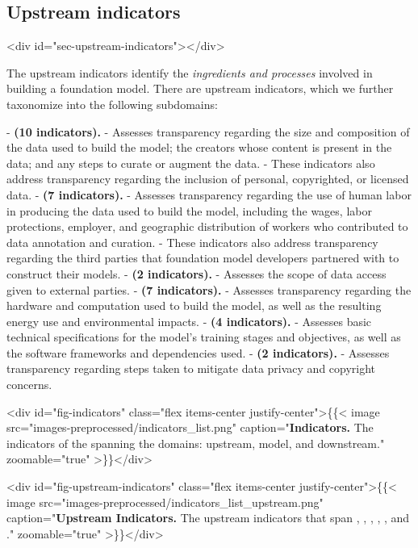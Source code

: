 \documentclass[screen, authorversion, acmsmall]{acmart}
\begin{document}
\hypertarget{upstream-indicators}{\subsection{Upstream indicators}}
<div id="sec-upstream-indicators"></div>

The upstream indicators identify the \emph{ingredients and processes} involved in building a foundation model. 
There are \numupstreamindicators upstream indicators, which we further taxonomize into the following \numupstreamsubdomains subdomains:

-  \textbf{\data (10 indicators).}
- Assesses transparency regarding the size and composition of the data used to build the model; the creators whose content is present in the data; and any steps to curate or augment the data.
- These indicators also address transparency regarding the inclusion of personal, copyrighted, or licensed data.
-  \textbf{\labor (7 indicators).}
- Assesses transparency regarding the use of human labor in producing the data used to build the model, including the wages, labor protections, employer, and geographic distribution of workers who contributed to data annotation and curation.
- These indicators also address transparency regarding the third parties that foundation model developers partnered with to construct their models.
-  \textbf{\dataaccess (2 indicators).}
- Assesses the scope of data access given to external parties.
-  \textbf{\compute (7 indicators).}
- Assesses transparency regarding the hardware and computation used to build the model, as well as the resulting energy use and environmental impacts.
-  \textbf{\methods (4 indicators).}
- Assesses basic technical specifications for the model's training stages and objectives, as well as the software frameworks and dependencies used.
-  \textbf{\datamitigations (2 indicators).}
- Assesses transparency regarding steps taken to mitigate data privacy and copyright concerns.

<div id="fig-indicators" class="flex items-center justify-center">\{\{< image src="images-preprocessed/indicators_list.png" caption="\textbf{Indicators.} The \numindicators indicators of the \projectname spanning the \numdomains domains: upstream, model, and downstream." zoomable="true" >\}\}</div>



<div id="fig-upstream-indicators" class="flex items-center justify-center">\{\{< image src="images-preprocessed/indicators_list_upstream.png" caption="\textbf{Upstream Indicators.} The \numupstreamindicators upstream indicators that span \data, \labor, \dataaccess, \compute, \methods, and \datamitigations." zoomable="true" >\}\}</div>
\end{document}
